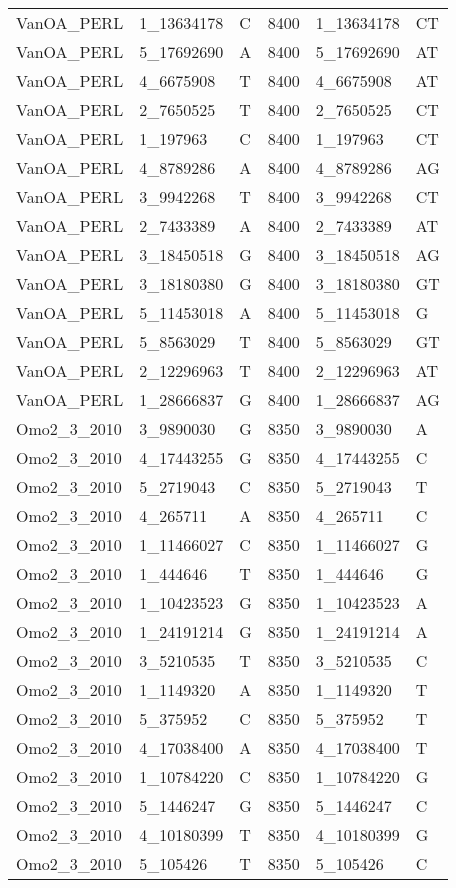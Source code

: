 \begin{center}
\begin{longtable}{|l|l|l|l|l|l|}
VanOA\_PERL&1\_13634178&C&8400&1\_13634178&CT\\
VanOA\_PERL&5\_17692690&A&8400&5\_17692690&AT\\
VanOA\_PERL&4\_6675908&T&8400&4\_6675908&AT\\
VanOA\_PERL&2\_7650525&T&8400&2\_7650525&CT\\
VanOA\_PERL&1\_197963&C&8400&1\_197963&CT\\
VanOA\_PERL&4\_8789286&A&8400&4\_8789286&AG\\
VanOA\_PERL&3\_9942268&T&8400&3\_9942268&CT\\
VanOA\_PERL&2\_7433389&A&8400&2\_7433389&AT\\
VanOA\_PERL&3\_18450518&G&8400&3\_18450518&AG\\
VanOA\_PERL&3\_18180380&G&8400&3\_18180380&GT\\
VanOA\_PERL&5\_11453018&A&8400&5\_11453018&G\\
VanOA\_PERL&5\_8563029&T&8400&5\_8563029&GT\\
VanOA\_PERL&2\_12296963&T&8400&2\_12296963&AT\\
VanOA\_PERL&1\_28666837&G&8400&1\_28666837&AG\\
Omo2\_3\_2010&3\_9890030&G&8350&3\_9890030&A\\
Omo2\_3\_2010&4\_17443255&G&8350&4\_17443255&C\\
Omo2\_3\_2010&5\_2719043&C&8350&5\_2719043&T\\
Omo2\_3\_2010&4\_265711&A&8350&4\_265711&C\\
Omo2\_3\_2010&1\_11466027&C&8350&1\_11466027&G\\
Omo2\_3\_2010&1\_444646&T&8350&1\_444646&G\\
Omo2\_3\_2010&1\_10423523&G&8350&1\_10423523&A\\
Omo2\_3\_2010&1\_24191214&G&8350&1\_24191214&A\\
Omo2\_3\_2010&3\_5210535&T&8350&3\_5210535&C\\
Omo2\_3\_2010&1\_1149320&A&8350&1\_1149320&T\\
Omo2\_3\_2010&5\_375952&C&8350&5\_375952&T\\
Omo2\_3\_2010&4\_17038400&A&8350&4\_17038400&T\\
Omo2\_3\_2010&1\_10784220&C&8350&1\_10784220&G\\
Omo2\_3\_2010&5\_1446247&G&8350&5\_1446247&C\\
Omo2\_3\_2010&4\_10180399&T&8350&4\_10180399&G\\
Omo2\_3\_2010&5\_105426&T&8350&5\_105426&C\\

\end{longtable}
\end{center}
